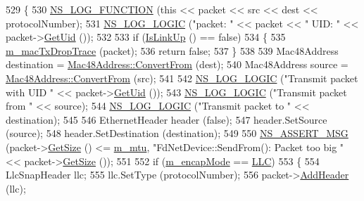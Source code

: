 \begin{DoxyCode}
529 \{
530   \hyperlink{log-macros-disabled_8h_a90b90d5bad1f39cb1b64923ea94c0761}{NS\_LOG\_FUNCTION} (\textcolor{keyword}{this} << packet << src << dest << protocolNumber);
531   \hyperlink{group__logging_ga88acd260151caf2db9c0fc84997f45ce}{NS\_LOG\_LOGIC} (\textcolor{stringliteral}{"packet: "} << packet << \textcolor{stringliteral}{" UID: "} << packet->\hyperlink{classns3_1_1Packet_a1f212c825b50e54d94f5b9ae99592e6a}{GetUid} ());
532 
533   \textcolor{keywordflow}{if} (\hyperlink{classns3_1_1FdNetDevice_afe7a9225c43079850621ff0af3dc50c9}{IsLinkUp} () == \textcolor{keyword}{false})
534     \{
535       \hyperlink{classns3_1_1FdNetDevice_ad204b6948cb00479cc229465c6c07ebb}{m\_macTxDropTrace} (packet);
536       \textcolor{keywordflow}{return} \textcolor{keyword}{false};
537     \}
538 
539   Mac48Address destination = \hyperlink{classns3_1_1Mac48Address_a911ce13603a9ef837545a032b6523ae4}{Mac48Address::ConvertFrom} (dest);
540   Mac48Address source = \hyperlink{classns3_1_1Mac48Address_a911ce13603a9ef837545a032b6523ae4}{Mac48Address::ConvertFrom} (src);
541 
542   \hyperlink{group__logging_ga88acd260151caf2db9c0fc84997f45ce}{NS\_LOG\_LOGIC} (\textcolor{stringliteral}{"Transmit packet with UID "} << packet->\hyperlink{classns3_1_1Packet_a1f212c825b50e54d94f5b9ae99592e6a}{GetUid} ());
543   \hyperlink{group__logging_ga88acd260151caf2db9c0fc84997f45ce}{NS\_LOG\_LOGIC} (\textcolor{stringliteral}{"Transmit packet from "} << source);
544   \hyperlink{group__logging_ga88acd260151caf2db9c0fc84997f45ce}{NS\_LOG\_LOGIC} (\textcolor{stringliteral}{"Transmit packet to "} << destination);
545 
546   EthernetHeader header (\textcolor{keyword}{false});
547   header.SetSource (source);
548   header.SetDestination (destination);
549 
550   \hyperlink{assert_8h_aff5ece9066c74e681e74999856f08539}{NS\_ASSERT\_MSG} (packet->\hyperlink{classns3_1_1Packet_a462855c9929954d4301a4edfe55f4f1c}{GetSize} () <= \hyperlink{classns3_1_1FdNetDevice_a26eb80ddedbacaf1f5a1c19940e7225d}{m\_mtu}, \textcolor{stringliteral}{"FdNetDevice::SendFrom(): Packet too
       big "} << packet->\hyperlink{classns3_1_1Packet_a462855c9929954d4301a4edfe55f4f1c}{GetSize} ());
551 
552   \textcolor{keywordflow}{if} (\hyperlink{classns3_1_1FdNetDevice_aa5d97abfd57576f6b80423ac764e5cc8}{m\_encapMode} == \hyperlink{classns3_1_1FdNetDevice_abdacbf10c181f50998a98e7688016618ac6f7f5fa39999c05c1b1c2c5e5dd8889}{LLC})
553     \{
554       LlcSnapHeader llc;
555       llc.SetType (protocolNumber);
556       packet->\hyperlink{classns3_1_1Packet_a465108c595a0bc592095cbcab1832ed8}{AddHeader} (llc);

\end{DoxyCode}
